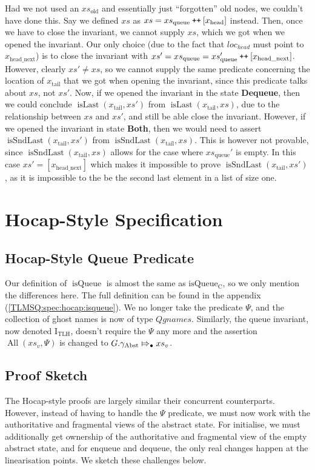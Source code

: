 \documentclass[a4paper, 10pt]{report}
\theoremstyle{definition}
\newcommand{\isqueue}{\operatorname{isQueue}}
\newcommand{\isqueueconc}{\operatorname{isQueue_{C}}}
\newcommand{\TLQueueInvariantHocap}{\operatorname{I_{TLH}}}
\newcommand{\Qgnames}{Qgnames}
\newcommand{\xsc}{xs}
\newcommand{\xsqueue}{xs_{\mathrm{queue}}}
\newcommand{\xsold}{xs_{\mathrm{old}}}
\newcommand{\AllP}{\operatorname{All}}
\newcommand{\isLast}{\operatorname{isLast}}
\newcommand{\isSndLast}{\operatorname{isSndLast}}
\newcommand{\node}{x}
\newcommand{\nodeN}[1]{\node_{\mathrm{#1}}}
\newcommand{\nodehead}{\nodeN{head}}
\newcommand{\nodetail}{\nodeN{tail}}
\newcommand{\nodeheadnext}{\nodeN{head\_next}}
\newcommand{\absvalueList}{xs_v}
\newcommand{\DequeueState}{\textbf{Dequeue}\xspace}
\newcommand{\BothState}{\textbf{Both}\xspace}
\newcommand{\Qg}{G}
\newcommand{\gabst}{\gname_{\mathrm{Abst}}}
\newcommand\catenate{\mathbin{\text{\ttfamily\upshape ++}}}
\newcommand{\abstractstateauth}[2]{#1 \Mapsto_{\bullet} #2}
\begin{document}
Had we not used an $\xsold$ and essentially just ``forgotten'' old nodes, we couldn't have done this. Say we defined $\xsc$ as $\xsc = \xsqueue \catenate [\nodehead]$ instead. Then, once we have to close the invariant, we cannot supply $\xsc$, which we got when we opened the invariant. Our only choice (due to the fact that $loc_{head}$ must point to $\nodeheadnext$) is to close the invariant with $\xsc' = \xsqueue = \xsqueue' \catenate [\nodeheadnext]$. However, clearly $\xsc' \neq \xsc$, so we cannot supply the same predicate concerning the location of $\nodetail$ that we got when opening the invariant, since this predicate talks about $\xsc$, not $\xsc'$. Now, if we opened the invariant in the state \DequeueState, then we could conclude $\isLast(\nodetail, \xsc')$ from $\isLast(\nodetail, \xsc)$, due to the relationship between $\xsc$ and $\xsc'$, and still be able close the invariant. However, if we opened the invariant in state \BothState, then we would need to assert $\isSndLast(\nodetail, \xsc')$ from $\isSndLast(\nodetail, \xsc)$. This is however not provable, since $\isSndLast(\nodetail, \xsc)$ allows for the case where $\xsqueue'$ is empty. In this case $\xsc' = [\nodeheadnext]$ which makes it impossible to prove $\isSndLast(\nodetail, \xsc')$, as it is impossible to the be the second last element in a list of size one.


\section{Hocap-Style Specification}
\label{TLMSQSPECS:section:hocap}

\subsection{Hocap-Style Queue Predicate}
\label{TLMSQSPECS:hocap:sub:hocap-queue-pred}
Our definition of $\isqueue$ is almost the same as $\isqueueconc$, so we only mention the differences here. The full definition can be found in the appendix (\ref{TLMSQ:spec:hocap:isqueue}). We no longer take the predicate $\Psi$, and the collection of ghost names is now of type $\Qgnames$. Similarly, the queue invariant, now denoted $\TLQueueInvariantHocap$, doesn't require the $\Psi$ any more and the assertion $\AllP(\absvalueList, \Psi)$ is changed to $\abstractstateauth{\Qg.\gabst}{\absvalueList}$.

\subsection{Proof Sketch}  
\label{TLMSQSPECS:hocap:sub:proof-Sketch}
The Hocap-style proofs are largely similar their concurrent counterparts. However, instead of having to handle the $\Psi$ predicate, we must now work with the authoritative and fragmental views of the abstract state. For initialise, we must additionally get ownership of the authoritative and fragmental view of the empty abstract state, and for enqueue and dequeue, the only real changes happen at the linearisation points. We sketch these challenges below.
\end{document}
